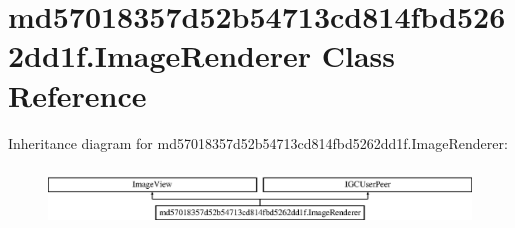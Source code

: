 \hypertarget{classmd57018357d52b54713cd814fbd5262dd1f_1_1ImageRenderer}{}\section{md57018357d52b54713cd814fbd5262dd1f.\+Image\+Renderer Class Reference}
\label{classmd57018357d52b54713cd814fbd5262dd1f_1_1ImageRenderer}
Inheritance diagram for md57018357d52b54713cd814fbd5262dd1f.\+Image\+Renderer\+:\begin{figure}[H]
\begin{center}
\leavevmode
\includegraphics[height=1.595442cm]{classmd57018357d52b54713cd814fbd5262dd1f_1_1ImageRenderer}
\end{center}
\end{figure}
